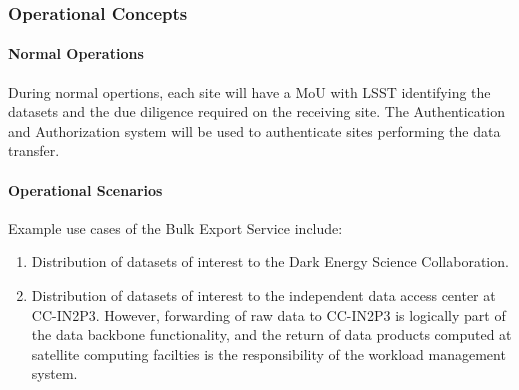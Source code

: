 \subsubsection{Operational Concepts}

\paragraph{Normal Operations}

During normal opertions, each site will have a MoU with LSST identifying the datasets and the due diligence required on the receiving site. The Authentication and Authorization system will be used to authenticate sites performing the data transfer.

\paragraph{Operational Scenarios}

Example use cases of the Bulk Export Service include:

\begin{enumerate}

\item Distribution of datasets of interest to the Dark Energy Science Collaboration.

\item Distribution of datasets of interest to the independent data access center at CC-IN2P3. However, forwarding of raw data to CC-IN2P3 is logically part of the data backbone functionality, and the return of data products computed at satellite computing facilties is the responsibility of the workload management system.

\end{enumerate}

